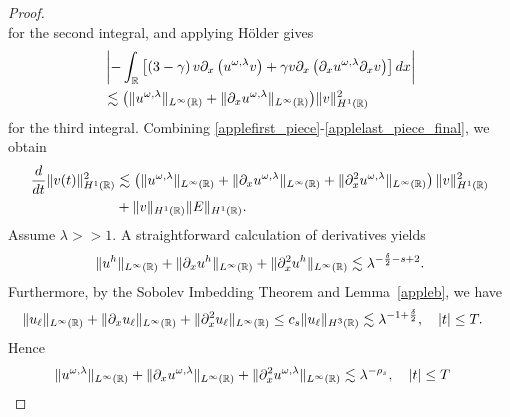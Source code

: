 \begin{proof}
\begin{equation}
\end{equation}
for the second integral, and applying H\"older gives 
\begin{equation}
\begin{split}
\label{applelast_piece_final}
& \left | -\int_{\mathbb{R}} \left[ \left( 3-\gamma \right)v
\partial_x \left( u^{\omega,\lambda} v \right) + \gamma
v \partial_x \left( \partial_x u^{\omega,\lambda} \partial_x v \right)\right]dx \right |
\\
& \lesssim \big(
\|u^{\omega,\lambda}\|_{L^\infty(\mathbb{R})}
+ \|\partial_x u^{\omega,\lambda} \|_{L^\infty(\mathbb{R})} \big)
\|v\|_{H^1(\mathbb{R})}^2
\end{split}
\end{equation}
%
%
%
for the third integral. Combining 
\eqref{applefirst_piece}-\eqref{applelast_piece_final}, we 
obtain
%
%
\begin{equation}
\begin{split}
\label{appleenergy-estimate-best}
\frac{d}{dt} \|v(t)\|_{H^1(\mathbb{R})}^2
& \lesssim \left( \|u^{\omega,\lambda}\|_{L^\infty(\mathbb{R})} + \|
\partial_x u^{\omega,\lambda} \|_{L^\infty(\mathbb{R})} + \|\partial_x^2 u^{\omega,\lambda} 
\|_{L^\infty (\mathbb{R})} \right)
\|v\|_{H^1(\mathbb{R})}^2 \\
&+ \|v\|_{H^1(\mathbb{R})} \|E\|_{H^1(\mathbb{R})}.
\end{split}
\end{equation}
%
%
Assume $\lambda >>1$. A straightforward calculation of derivatives yields
%
%
\begin{equation*}
\begin{split}
\|u^h\|_{L^\infty(\mathbb{R})} + \|\partial_x u^h\|_{L^\infty(\mathbb{R})} + \|\partial_x^2
u^h\|_{L^\infty(\mathbb{R})} \lesssim \lambda^{- \frac{\delta}{2} - s +2 }.
\label{apple53}
\end{split}
\end{equation*}
%
%
Furthermore, by the Sobolev Imbedding Theorem and Lemma~\ref{appleb}, we have
%
%
%
%
\begin{equation*}
\begin{split}
\|u_\ell\|_{L^\infty(\mathbb{R})} + \|\partial_x u_\ell \|_{L^\infty(\mathbb{R})} + \|\partial_x^2
u_\ell\|_{L^\infty(\mathbb{R})}
& \le c_s \|u_\ell\|_{H^3(\mathbb{R})} 
\lesssim \lambda^{-1 + \frac{\delta}{2}}, 
\quad |t| \le T.
\label{apple55}
\end{split}
\end{equation*}
%
%
Hence
%
%
\begin{equation}
\begin{split}
\|u^{\omega,\lambda}\|_{L^\infty(\rr)} + \|\p_x 
u^{\omega,\lambda}\|_{L^\infty(\rr)} + \|\p_x^2
u^{\omega,\lambda}\|_{L^\infty(\rr)}
& \lesssim \lambda^{-\rho_s}, \quad |t| \le T

\end{split}
\end{equation}
\end{proof}
